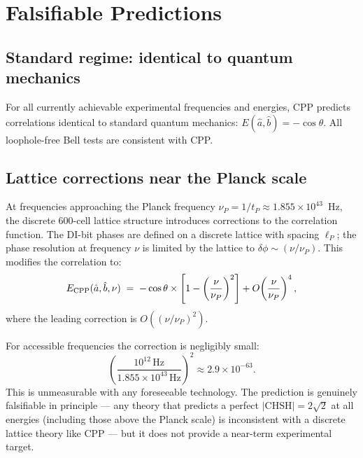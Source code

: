 \documentclass[11pt,a4paper]{article}
\begin{document}
\section{Falsifiable Predictions}
\label{sec:predictions}

\subsection{Standard regime: identical to quantum mechanics}

For all currently achievable experimental frequencies and energies,
CPP predicts correlations identical to standard quantum mechanics:
$E(\hat{a},\hat{b}) = -\cos\theta$.  All loophole-free Bell tests
\citep{hensen2015,giustina2015,shalm2015} are consistent with CPP.

\subsection{Lattice corrections near the Planck scale}

At frequencies approaching the Planck frequency
$\nu_P = 1/t_P \approx 1.855 \times 10^{43}$~Hz, the discrete
600-cell lattice structure introduces corrections to the correlation
function.  The DI-bit phases are defined on a discrete lattice with
spacing $\ell_P$; the phase resolution at frequency $\nu$ is limited
by the lattice to $\delta\phi \sim (\nu/\nu_P)$.  This modifies the
correlation to:
\begin{equation}
E_{\rm CPP}(\hat{a},\hat{b},\nu) \;=\;
-\cos\theta \times \left[1 - \left(\frac{\nu}{\nu_P}\right)^2\right]
+ O\!\left(\frac{\nu}{\nu_P}\right)^4,
\label{eq:correction}
\end{equation}
where the leading correction is $O((\nu/\nu_P)^2)$.

For accessible frequencies the correction is negligibly small:
\begin{equation}
\left(\frac{10^{12}\,\text{Hz}}{1.855\times 10^{43}\,\text{Hz}}\right)^2
\approx 2.9 \times 10^{-63}.
\end{equation}
This is unmeasurable with any foreseeable technology.  The prediction
is genuinely falsifiable in principle --- any theory that predicts a
perfect $|\mathrm{CHSH}| = 2\sqrt{2}$ at all energies (including those
above the Planck scale) is inconsistent with a discrete lattice theory
like CPP --- but it does not provide a near-term experimental target.
\end{document}
